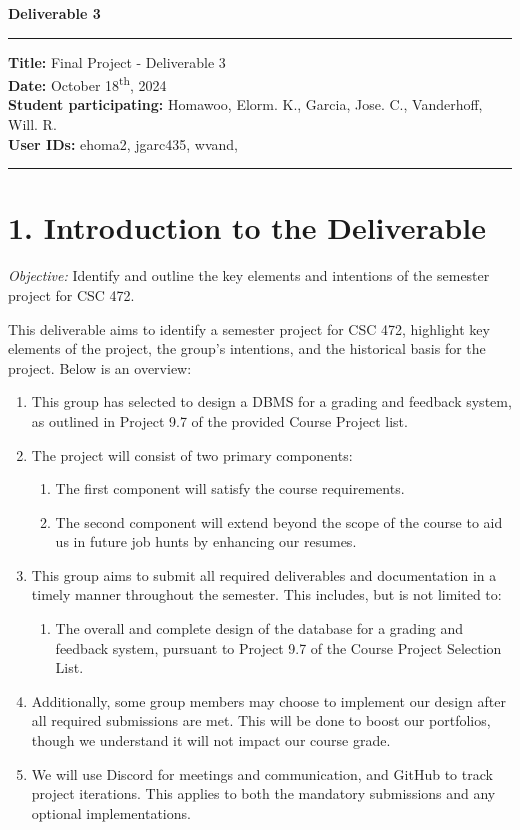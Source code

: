 \documentclass[12pt]{article}
\begin{document}
\begin{center}
    \Large\textbf{Deliverable 3}
\end{center}
\vspace{0.5em}
\hrule
\vspace{1em}

\noindent
\textbf{Title:} Final Project - Deliverable 3 \\
\textbf{Date:} October 18\textsuperscript{th}, 2024 \\
\textbf{Student participating: } Homawoo, Elorm. K., Garcia, Jose. C., Vanderhoff, Will. R. \\
\textbf{User IDs:}  ehoma2, jgarc435, wvand,\\
\vspace{1em}
\hrule

\section*{1. Introduction to the Deliverable}

\noindent
\textit{Objective:} Identify and outline the key elements and intentions of the semester project for CSC 472.

\noindent
This deliverable aims to identify a semester project for CSC 472, highlight key elements of the project, the group’s intentions, and the historical basis for the project. Below is an overview:

\begin{enumerate}
    \item This group has selected to design a DBMS for a grading and feedback system, as outlined in Project 9.7 of the provided Course Project list.
    \item The project will consist of two primary components:
    \begin{enumerate}
        \item The first component will satisfy the course requirements.
        \item The second component will extend beyond the scope of the course to aid us in future job hunts by enhancing our resumes.
    \end{enumerate}
    \item This group aims to submit all required deliverables and documentation in a timely manner throughout the semester. This includes, but is not limited to:
    \begin{enumerate}
        \item The overall and complete design of the database for a grading and feedback system, pursuant to Project 9.7 of the Course Project Selection List.
    \end{enumerate}
    \item Additionally, some group members may choose to implement our design after all required submissions are met. This will be done to boost our portfolios, though we understand it will not impact our course grade.
    \item We will use Discord for meetings and communication, and GitHub to track project iterations. This applies to both the mandatory submissions and any optional implementations.
\end{enumerate}
\end{document}
